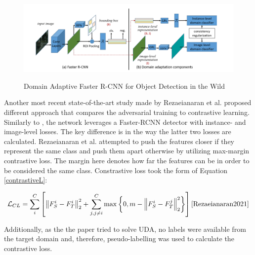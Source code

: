 \documentclass[english, 12pt, a4paper, elec, utf8, a-1b, online]{aaltothesis}
\begin{document}
\begin{figure}[htb]
	\begin{center}
		\includegraphics[width=16cm]{./faster_rcnn_DA.png}
	\end{center}
	\caption{Domain Adaptive Faster R-CNN for Object Detection in the Wild\cite{Chen2018}}
	\begin{center}
		\label{Faster_rcnn_DA}
	\end{center}
\end{figure}
\FloatBarrier


Another most recent state-of-the-art study made by Rezaeianaran et al. \cite{Rezaeianaran2021} proposed different approach that compares the adversarial training to contrastive learning. Similarly to \cite{Chen2018}, the network leverages a Faster-RCNN detector with instance- and image-level losses. The key difference is in the way the latter two losses are calculated. Rezaeianaran et al. attempted to push the features closer if they represent the same class and push them apart otherwise by utilizing max-margin contrastive loss. The margin here denotes how far the features can be in order to be considered the same class. Constrastive loss took the form of Equation \ref{contrastiveL}:

\begin{equation}
\mathcal{L}_{C L}=\sum_{i}^{C}\left[\left\|F_{S}^{i}-F_{T}^{i}\right\|_{2}^{2}+\sum_{j, j \neq i}^{C} \max \left\{0, m-\left\|F_{S}^{i}-F_{T}^{j}\right\|_{2}^{2}\right\}\right]
\label{contrastiveL} 
\cite{Rezaeianaran2021} 
\end{equation}

Additionally, as the the paper tried to solve UDA, no labels were available from the target domain and, therefore, pseudo-labelling was used to calculate the contrastive loss.  
\end{document}
